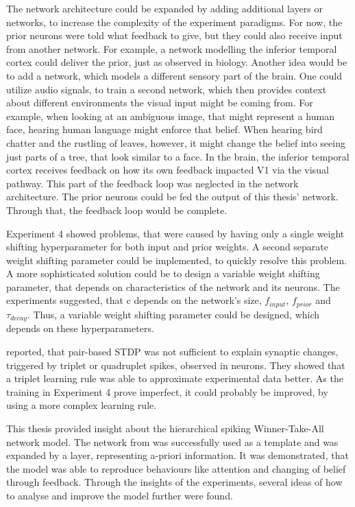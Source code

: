 The network architecture could be expanded by adding additional layers or networks, to increase the complexity of the experiment paradigms. For now, the prior neurons were told what feedback to give, but they could also receive input from another network. For example, a network modelling the inferior temporal cortex could deliver the prior, just as observed in biology. 
Another idea would be to add a network, which models a different sensory part of the brain. One could utilize audio signals, to train a second network, which then provides context about different environments the visual input might be coming from. For example, when looking at an ambiguous image, that might represent a human face, hearing human language might enforce that belief. When hearing bird chatter and the rustling of leaves, however, it might change the belief into seeing just parts of a tree, that look similar to a face.  
In the brain, the inferior temporal cortex receives feedback on how its own feedback impacted V1 via the visual pathway. This part of the feedback loop was neglected in the network architecture. The prior neurons could be fed the output of this thesis' network. Through that, the feedback loop would be complete.

Experiment 4 showed problems, that were caused by having only a single weight shifting hyperparameter for both input and prior weights. A second separate weight shifting parameter could be implemented, to quickly resolve this problem. A more sophisticated solution could be to design a variable weight shifting parameter, that depends on characteristics of the network and its neurons. The experiments suggested, that c depends on the network's size, $f_{input}$, $f_{prior}$ and $\tau_{decay}$. Thus, a variable weight shifting parameter could be designed, which depends on these hyperparameters.

\citet{triplets} reported, that pair-based STDP was not sufficient to explain synaptic changes, triggered by triplet or quadruplet spikes, observed in neurons. They showed that a triplet learning rule was able to approximate experimental data better. As the training in Experiment 4 prove imperfect, it could probably be improved, by using a more complex learning rule.

This thesis provided insight about the hierarchical spiking Winner-Take-All network model. The network from \citet{nessler} was successfully used as a template and was expanded by a layer, representing a-priori information. It was demonstrated, that the model was able to reproduce behaviours like attention and changing of belief through feedback. Through the insights of the experiments, several ideas of how to analyse and improve the model further were found.


